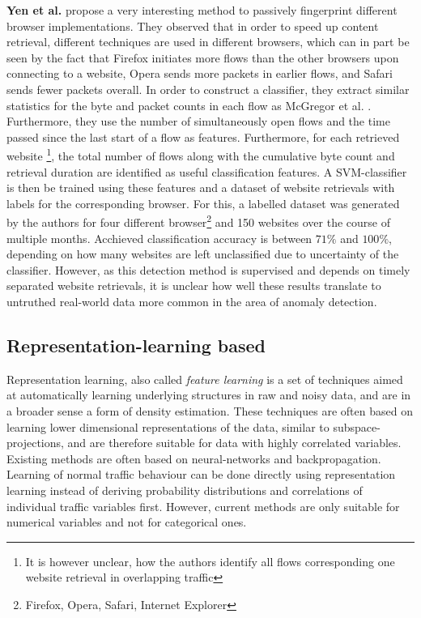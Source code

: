 \documentclass[a4paper,12pt,twoside]{report}
\begin{document}
\textbf{Yen et al.} \cite{yen2009browser} propose a very interesting method to passively fingerprint different browser implementations. They observed that in order to speed up content retrieval, different techniques are used in different browsers, which can in part be seen by the fact that Firefox initiates more flows than the other browsers upon connecting to a website, Opera sends more packets in earlier flows, and Safari sends fewer packets overall. In order to construct a classifier, they extract similar statistics for the byte and packet counts in each flow as McGregor et al. \cite{mcgregor2004flow}. Furthermore, they use the number of simultaneously open flows and the time passed since the last start of a flow as features. Furthermore, for each retrieved website \footnote{It is however unclear, how the authors identify all flows corresponding one website retrieval in overlapping traffic}, the total number of flows along with the cumulative byte count and retrieval duration are identified as useful classification features. A SVM-classifier is then be trained using these features and a dataset of website retrievals with labels for the corresponding browser. For this, a labelled dataset was generated by the authors for four different browser\footnote{Firefox, Opera, Safari, Internet Explorer} and 150 websites over the course of multiple months. Acchieved classification accuracy is between $71\%$ and $100\%$, depending on how many websites are left unclassified due to uncertainty of the classifier. However, as this detection method is supervised and depends on timely separated website retrievals, it is unclear how well these results translate to untruthed real-world data more common in the area of anomaly detection.






\subsection{Representation-learning based}

Representation learning, also called \textit{feature learning} is a set of techniques aimed at automatically learning underlying structures in raw and noisy data, and are in a broader sense a form of density estimation. These techniques are often based on learning lower dimensional representations of the data, similar to subspace-projections, and are therefore suitable for data with highly correlated variables. Existing methods are often based on neural-networks and backpropagation. Learning of normal traffic behaviour can be done directly using representation learning instead of deriving probability distributions and correlations of individual traffic variables first. However, current methods are only suitable for numerical variables and not for categorical ones.
\end{document}
